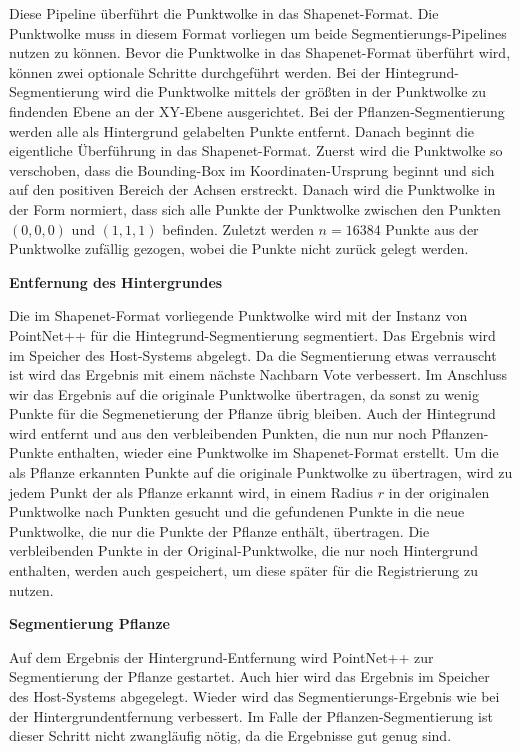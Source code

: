 \documentclass[12pt,titlepage, twoside]{article}
\begin{document}
Diese Pipeline überführt die Punktwolke in das Shapenet-Format. Die Punktwolke muss in diesem Format vorliegen um beide Segmentierungs-Pipelines nutzen zu können.
Bevor die Punktwolke in das Shapenet-Format überführt wird, können zwei optionale Schritte durchgeführt werden.
Bei der Hintegrund-Segmentierung wird die Punktwolke mittels der größten in der Punktwolke zu findenden Ebene an der XY-Ebene ausgerichtet.
Bei der Pflanzen-Segmentierung werden alle als Hintergrund gelabelten Punkte entfernt. Danach beginnt die eigentliche Überführung in das Shapenet-Format.
Zuerst wird die Punktwolke so verschoben, dass die Bounding-Box im Koordinaten-Ursprung beginnt und sich auf den positiven Bereich der Achsen erstreckt.
Danach wird die Punktwolke in der Form normiert, dass sich alle Punkte der Punktwolke zwischen den Punkten $(0,0,0)$ und $(1,1,1)$ befinden.
Zuletzt werden $n=16384$ Punkte aus der Punktwolke zufällig gezogen, wobei die Punkte nicht zurück gelegt werden.

\textbf{Entfernung des Hintergrundes}

Die im Shapenet-Format vorliegende Punktwolke wird mit der Instanz von PointNet++ für die Hintegrund-Segmentierung segmentiert. Das Ergebnis wird im Speicher des Host-Systems abgelegt.
Da die Segmentierung etwas verrauscht ist wird das Ergebnis mit einem nächste Nachbarn Vote verbessert.
Im Anschluss wir das Ergebnis auf die originale Punktwolke übertragen, da sonst zu wenig Punkte für die Segmenetierung der Pflanze übrig bleiben.
Auch der Hintegrund wird entfernt und aus den verbleibenden Punkten, die nun nur noch Pflanzen-Punkte enthalten, wieder eine Punktwolke im Shapenet-Format erstellt.
Um die als Pflanze erkannten Punkte auf die originale Punktwolke zu übertragen, wird zu jedem Punkt der als Pflanze erkannt wird, in einem Radius $r$ in der originalen Punktwolke nach Punkten gesucht 
und die gefundenen Punkte in die neue Punktwolke, die nur die Punkte der Pflanze enthält, übertragen. 
Die verbleibenden Punkte in der Original-Punktwolke, die nur noch Hintergrund enthalten, werden auch gespeichert, um diese später für die Registrierung zu nutzen.


\textbf{Segmentierung Pflanze}

Auf dem Ergebnis der Hintergrund-Entfernung wird PointNet++ zur Segmentierung der Pflanze gestartet. Auch hier wird das Ergebnis im Speicher des Host-Systems abgegelegt. 
Wieder wird das Segmentierungs-Ergebnis wie bei der Hintergrundentfernung verbessert. Im Falle der Pflanzen-Segmentierung ist dieser Schritt nicht zwangläufig nötig, da die Ergebnisse gut genug sind.
\end{document}
